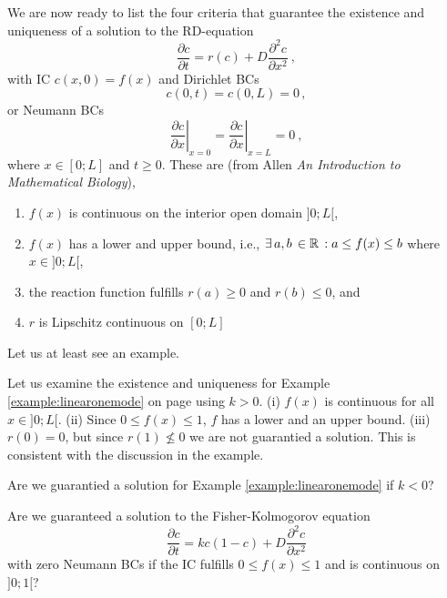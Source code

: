We are now ready to list the four criteria that guarantee the existence and
uniqueness of a solution to the RD-equation 
\begin{equation}
  \frac{\partial c}{\partial t} = r(c) + D \frac{\partial^2 c}{\partial x^2}
 \ ,  
\end{equation}
with IC $c(x,0)=f(x)$ and Dirichlet BCs
\begin{equation}
   c(0,t)=c(0,L)=0 \, ,
\end{equation}
or Neumann BCs
\begin{equation}
    \left.\frac{\partial c}{\partial x}\right|_{x=0} = 
  \left.\frac{\partial c}{\partial x}\right|_{x=L} = 0 \ , 
\end{equation}
where  $x \in [0;L]$ and $t \geq 0$. These are (from Allen
\textit{An Introduction to Mathematical Biology}),
\begin{enumerate}
\item{$f(x)$ is continuous on the interior open domain $]0;L[$,}
\item{$f(x)$ has a lower and upper bound, i.e.,
    $\exists \, a,b \, \in \mathbb{R} \, : a\leq f(x) \leq b$ where
    $x \in ]0;L[$,}
\item{the reaction function fulfills $r(a) \geq 0$ and $r(b) \leq 0$, and }
\item{$r$ is Lipschitz continuous on $[0;L]$}
\end{enumerate}
Let us at least see an example.

\begin{example}
  Let us examine the existence and uniqueness for Example
	\ref{example:linearonemode} on page \pageref{example:linearonemode} using $k>0$. (i) $f(x)$
  is continuous for all $x \in ]0;L[$. (ii) Since $0\leq f(x) \leq 1$, $f$
  has a lower and an upper bound. (iii) $r(0) = 0$, but since $r(1) \not\leq
  0$ we are not guarantied a solution. This is consistent with the discussion in
  the example.
\end{example}

\begin{question}
	Are we guarantied a solution for Example \ref{example:linearonemode} if $k<0$?
\end{question}

\begin{exerciseregion}
  \begin{exercise}
    Are we guaranteed a solution to the Fisher-Kolmogorov equation
    \begin{equation}
      \frac{\partial c}{\partial t} = kc(1-c) + D \frac{\partial^2c}{\partial x^2}  
    \end{equation}
	  with zero Neumann BCs if the IC fulfills 
	  $0\leq f(x) \leq 1$ and is continuous on $]0; 1[$? 
  \end{exercise}
\end{exerciseregion}






